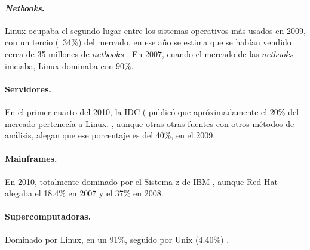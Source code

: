 \documentclass[spanish]{article}
\begin{document}
\paragraph{\textit{Netbooks}.} Linux ocupaba el segundo lugar entre los sistemas operativos más usados en 2009, con un tercio (~34\%) del mercado, en ese año se estima que se habían vendido cerca de 35 millones de $netbooks$ \cite{ComputerWorld-LinusNetbookShare}. En 2007, cuando el mercado de las $netbooks$ iniciaba, Linux dominaba con 90\%. \cite{Gizmodo}

\paragraph{Servidores. } En el primer cuarto del 2010, la IDC ( publicó que apróximadamente el 20\% del mercado pertenecía a Linux.  \cite{ComputerWorld-LinuxServers}, aunque otras otras fuentes con otros métodos de análisis, alegan que ese porcentaje es del 40\%, en el 2009. \cite{Netcraft}

\paragraph{Mainframes. } En 2010, totalmente dominado por el Sistema z de IBM \cite{OSNews}, aunque Red Hat alegaba el 18.4\% en 2007 y el 37\% en 2008. \cite{SearchDataCenter}

\paragraph{Supercomputadoras. } Dominado por Linux, en un 91\%, seguido por Unix (4.40\%) \cite{TOP500}.
\end{document}
